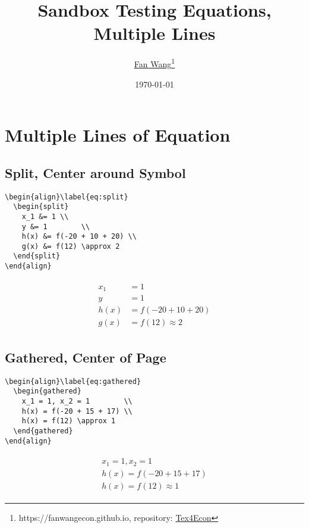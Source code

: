 \documentclass[12pt,english]{article}
\title{Sandbox Testing Equations, Multiple Lines}
\author{\href{https://fanwangecon.github.io/}{Fan Wang}\thanks{https://fanwangecon.github.io, repository: \href{https://fanwangecon.github.io/Tex4Econ/}{Tex4Econ}}}
\date{\today}
\begin{document}
\maketitle


\section{Multiple Lines of Equation}

\subsection{Split, Center around Symbol}
\begin{verbatim}
\begin{align}\label{eq:split}
  \begin{split}
    x_1 &= 1 \\
    y &= 1        \\
    h(x) &= f(-20 + 10 + 20) \\
    g(x) &= f(12) \approx 2
  \end{split}
\end{align}
\end{verbatim}

\begin{align}\label{eq:split}
  \begin{split}
    x_1 &= 1 \\
    y &= 1        \\
    h(x) &= f(-20 + 10 + 20) \\
    g(x) &= f(12) \approx 2
  \end{split}
\end{align}

\pagebreak

\subsection{Gathered, Center of Page}
\begin{verbatim}
\begin{align}\label{eq:gathered}
  \begin{gathered}
    x_1 = 1, x_2 = 1        \\
    h(x) = f(-20 + 15 + 17) \\
    h(x) = f(12) \approx 1
  \end{gathered}
\end{align}
\end{verbatim}

\begin{align}\label{eq:gathered}
  \begin{gathered}
    x_1 = 1, x_2 = 1        \\
    h(x) = f(-20 + 15 + 17) \\
    h(x) = f(12) \approx 1
  \end{gathered}
\end{align}
\end{document}
